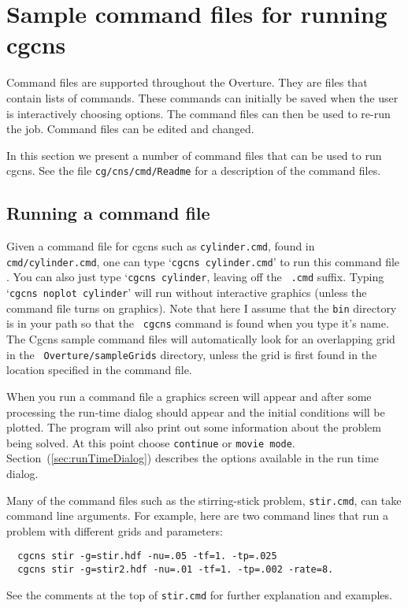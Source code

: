 \documentclass{article}
\newcommand{\Index}[1]{#1\index{#1}}
\begin{document}
\clearpage
\section{Sample command files for running cgcns} \label{sec:demo}

Command files are supported throughout the Overture. They are files
that contain lists of commands. These commands can initially be saved
when the user is interactively choosing options.  The \Index{command files}
can then be used to re-run the job. Command files can be edited and
changed.

In this section we present a number of command files that can be used
to run cgcns. See the file {\tt cg/cns/cmd/Readme} for a description of
the command files. 

\subsection{Running a command file}

Given a \Index{command file} for cgcns such as {\tt cylinder.cmd}, found in {\tt
cmd/cylinder.cmd}, one can type `{\tt cgcns cylinder.cmd}' to run this command
file . You can also just type `{\tt cgcns cylinder}, leaving off the {\tt
.cmd} suffix. Typing `{\tt cgcns noplot cylinder}' will run without
interactive graphics (unless the command file turns on graphics). Note that here
I assume that the {\tt bin} directory is in your path so that the {\tt
cgcns} command is found when you type it's name. The Cgcns sample
command files will automatically look for an overlapping grid in the {\tt
Overture/sampleGrids} directory, unless the grid is first found in the location
specified in the command file.

When you run a command file a graphics screen will appear and after some
processing the run-time dialog should appear and the initial conditions will be
plotted. The program will also print out some information about the problem
being solved. At this point choose {\tt continue} or {\tt movie
mode}. Section~(\ref{sec:runTimeDialog}) describes the options available in the
run time dialog.

Many of the command files such as the stirring-stick problem, {\tt stir.cmd},
can take command line arguments.  For example, here
are two command lines that run a problem with different grids and parameters:
\begin{verbatim}
  cgcns stir -g=stir.hdf -nu=.05 -tf=1. -tp=.025 
  cgcns stir -g=stir2.hdf -nu=.01 -tf=1. -tp=.002 -rate=8.
\end{verbatim}
See the comments at the top of {\tt stir.cmd} for further explanation and examples.
\end{document}
